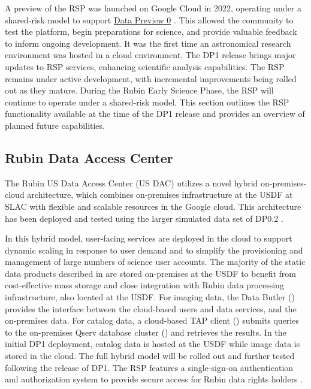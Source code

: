 A preview of the \gls{RSP} was launched on Google Cloud in 2022, operating under a shared-risk model to support \href{https://dp0.lsst.io/}{Data Preview 0} \citep{2024ASPC..535..227O}. This allowed the community to test the platform, begin preparations  for science, and provide valuable feedback to inform ongoing development.
It was the first time an astronomical research environment was hosted in a \gls{cloud} environment.
The \gls{DP1} release brings major updates to \gls{RSP} services, enhancing scientific analysis capabilities.
The \gls{RSP} remains under active development, with incremental improvements being rolled out as they mature.
During the Rubin Early Science Phase, the \gls{RSP} will continue to operate under a shared-risk model.
This section outlines the RSP functionality available at the time of the \gls{DP1} release and provides an overview of planned future capabilities.


\subsection{Rubin Data Access Center}
\label{ssec:usdac}
The Rubin US Data Access Center (US DAC) utilizes a novel hybrid on-premises-\gls{cloud} architecture, which combines on-premises infrastructure at the \gls{USDF} at SLAC with flexible and scalable resources in the Google \gls{cloud}.
This architecture has been deployed and tested using the larger simulated data set of DP0.2 \citep{2024SPIE13101E..2BO}.

In this hybrid model, user-facing services are deployed in the \gls{cloud} to support dynamic scaling in response to user demand and to simplify the provisioning and management of large numbers of science user accounts.
The majority of the static data products described in  are stored on-premises at the \gls{USDF} to benefit from cost-effective mass storage and close integration with Rubin data processing infrastructure, also located at the \gls{USDF}.
For imaging data, the Data Butler () provides the interface between the \gls{cloud}-based users and data services, and the on-premises data.
For catalog data, a \gls{cloud}-based \gls{TAP} client () submits queries to the on-premises \gls{Qserv} database cluster () and retrieves the results.
In the initial \gls{DP1} deployment, catalog data is hosted at the \gls{USDF} while image data is stored in the cloud.
The full hybrid model will be rolled out and further tested following the release of \gls{DP1}.
The RSP features a single-sign-on authentication and authorization system to provide secure access for Rubin data rights holders \citep{rdo-013}.

